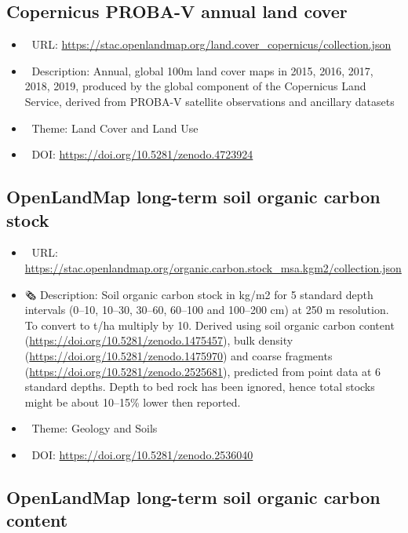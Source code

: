 \documentclass[
  graybox,natbib,nospthms]{svmono}
\providecommand{\tightlist}{%
  \setlength{\itemsep}{0pt}\setlength{\parskip}{0pt}}
\providecommand{\tightlist}{\setlength{\itemsep}{0pt}\setlength{\parskip}{0pt}}
\begin{document}
\hypertarget{copernicus-proba-v-annual-land-cover}{%
\subsection{Copernicus PROBA-V annual land cover}\label{copernicus-proba-v-annual-land-cover}}

\begin{itemize}
\tightlist
\item
  🔗 URL: \url{https://stac.openlandmap.org/land.cover_copernicus/collection.json}
\item
  📰 Description: Annual, global 100m land cover maps in 2015, 2016, 2017, 2018, 2019, produced by the global component of the Copernicus Land Service, derived from PROBA-V satellite observations and ancillary datasets
\item
  📝 Theme: Land Cover and Land Use
\item
  📂 DOI: \url{https://doi.org/10.5281/zenodo.4723924}
\end{itemize}

\hypertarget{openlandmap-long-term-soil-organic-carbon-stock}{%
\subsection{OpenLandMap long-term soil organic carbon stock}\label{openlandmap-long-term-soil-organic-carbon-stock}}

\begin{itemize}
\tightlist
\item
  🔗 URL: \url{https://stac.openlandmap.org/organic.carbon.stock_msa.kgm2/collection.json}
\item
  🗞 Description: Soil organic carbon stock in kg/m2 for 5 standard depth intervals (0--10, 10--30, 30--60, 60--100 and 100--200 cm) at 250 m resolution. To convert to t/ha multiply by 10. Derived using soil organic carbon content (\url{https://doi.org/10.5281/zenodo.1475457}), bulk density (\url{https://doi.org/10.5281/zenodo.1475970}) and coarse fragments (\url{https://doi.org/10.5281/zenodo.2525681}), predicted from point data at 6 standard depths. Depth to bed rock has been ignored, hence total stocks might be about 10--15\% lower then reported.
\item
  📝 Theme: Geology and Soils
\item
  📂 DOI: \url{https://doi.org/10.5281/zenodo.2536040}
\end{itemize}

\hypertarget{openlandmap-long-term-soil-organic-carbon-content}{%
\subsection{OpenLandMap long-term soil organic carbon content}\label{openlandmap-long-term-soil-organic-carbon-content}}
\end{document}
